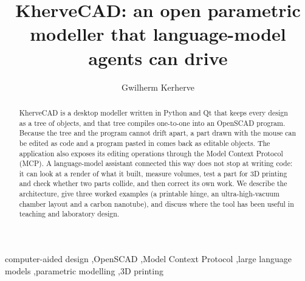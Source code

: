 \documentclass[preprint,12pt]{elsarticle}
\begin{document}
\begin{frontmatter}

\title{KherveCAD: an open parametric modeller that language-model agents can drive}

\author[aff1]{Gwilherm Kerherve}
\address[aff1]{Department of Materials, Imperial College London, Royal School of Mines, South Kensington, London SW7 2BP, United Kingdom}

\begin{abstract}
KherveCAD is a desktop modeller written in Python and Qt that keeps every design as a tree of objects, and that tree compiles one-to-one into an OpenSCAD program. Because the tree and the program cannot drift apart, a part drawn with the mouse can be edited as code and a program pasted in comes back as editable objects. The application also exposes its editing operations through the Model Context Protocol (MCP). A language-model assistant connected this way does not stop at writing code: it can look at a render of what it built, measure volumes, test a part for 3D printing and check whether two parts collide, and then correct its own work. We describe the architecture, give three worked examples (a printable hinge, an ultra-high-vacuum chamber layout and a carbon nanotube), and discuss where the tool has been useful in teaching and laboratory design.
\end{abstract}

\begin{keyword}
computer-aided design \sep OpenSCAD \sep Model Context Protocol \sep large language models \sep parametric modelling \sep 3D printing
\end{keyword}

\end{frontmatter}
\end{document}
